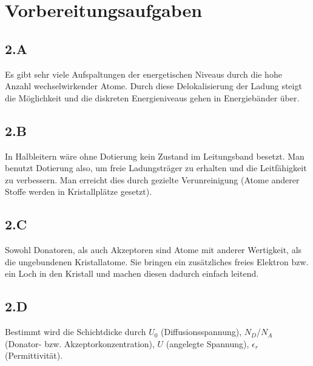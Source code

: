 \section{Vorbereitungsaufgaben}
\subsection{2.A}
Es gibt sehr viele Aufspaltungen der energetischen Niveaus durch die hohe Anzahl wechselwirkender Atome. Durch diese Delokalisierung der Ladung steigt die Möglichkeit und die diskreten Energieniveaus gehen in Energiebänder über.
\subsection{2.B}
In Halbleitern wäre ohne Dotierung kein Zustand im Leitungsband besetzt. Man benutzt Dotierung also, um freie Ladungsträger zu erhalten und die Leitfähigkeit zu verbessern. Man erreicht dies durch gezielte Verunreinigung (Atome anderer Stoffe werden in Kristallplätze gesetzt).
\subsection{2.C}
Sowohl Donatoren, als auch Akzeptoren sind Atome mit anderer Wertigkeit, als die ungebundenen Kristallatome. Sie bringen ein zusätzliches freies Elektron bzw. ein Loch in den Kristall und machen diesen dadurch einfach leitend.
\subsection{2.D}
Bestimmt wird die Schichtdicke durch $U_0$ (Diffusionsspannung), $N_D$/$N_A$ (Donator- bzw. Akzeptorkonzentration), $U$ (angelegte Spannung), $\epsilon_r$ (Permittivität).
\begin{eqnarray*}
\end{eqnarray*}